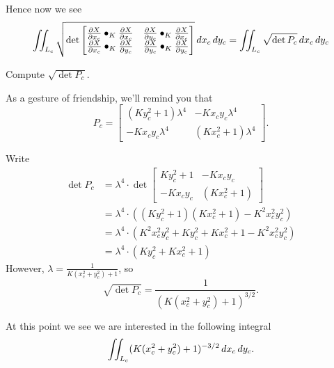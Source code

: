 \documentclass[newpage,hints,handout]{ximera}
\begin{document}
Hence now we see 
\[
\iint_{L_c} \sqrt{
  \det
  \begin{bmatrix}
    \pp[X]{x_c}\bullet_K \pp[X]{x_c} & \pp[X]{y_c}\bullet_K \pp[X]{x_c} \\
    \pp[X]{x_c}\bullet_K \pp[X]{y_c} & \pp[X]{y_c}\bullet_K \pp[X]{y_c}
  \end{bmatrix}
}\d x_c\d y_c = \iint_{L_c} \sqrt{\det P_c}\d x_c\d y_c
\]
\begin{problem}
  Compute $\sqrt{\det P_c}$.
  \begin{hint}
    As a gesture of friendship, we'll remind you that
    \[
 P_c =
     \begin{bmatrix}
       \left(Ky_c^2+1\right)\lambda^4 & -Kx_{c}y_{c}\lambda^4\\
       -Kx_{c}y_{c}\lambda^4 & \left(Kx_c^2+1\right)\lambda^4
     \end{bmatrix}.
    \]
  \end{hint}
  \begin{freeResponse}
    Write
    \begin{align*}
    \det P_c &= \lambda^4\cdot \det \begin{bmatrix}
       Ky_c^2+1 & -Kx_{c}y_{c}\\
       -Kx_{c}y_{c} & \left(Kx_c^2+1\right)
    \end{bmatrix}\\
    &= \lambda^4\cdot\left(\left( Ky_c^2+1\right)\left(Kx_c^2+1\right) - K^2x_{c}^2y_{c}^2\right)\\
    &= \lambda^4\cdot\left(K^2x_{c}^2y_{c}^2 + Ky_c^2+Kx_c^2+1-K^2x_{c}^2y_{c}^2\right)\\
    &= \lambda^4\cdot\left(Ky_c^2+Kx_c^2+1\right)
    \end{align*}
    However, $\lambda = \frac{1}{K\left(x_c^2+y_c^2\right)+1}$, so
    \[
    \sqrt{\det P_c} = \frac{1}{\left(K\left(x_c^2+y_c^2\right)+1\right)^{3/2}}.
    \]
  \end{freeResponse}
\end{problem}

At this point we see we are interested in the following integral
\[
\iint_{L_c} (K(x_c^2+y_c^2)+1)^{-3/2} \d x_c\d y_c.
\]
\end{document}
